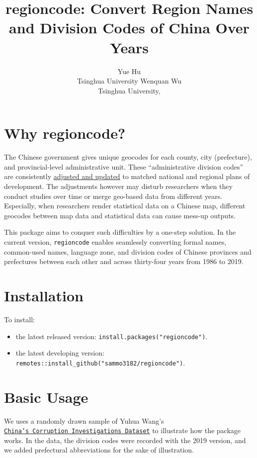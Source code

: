 \documentclass[
  article]{jss}
\author{Yue Hu\\Tsinghua University \And Wenquan Wu\\Tsinghua
University,}
\title{regioncode: Convert Region Names and Division Codes of China Over
Years}
\providecommand{\tightlist}{%
  \setlength{\itemsep}{0pt}\setlength{\parskip}{0pt}}\usepackage{longtable,booktabs,array}
\begin{document}
\maketitle
\hypertarget{why-regioncode}{%
\section{Why regioncode?}\label{why-regioncode}}

The Chinese government gives unique geocodes for each county, city
(prefecture), and provincial-level administrative unit. These
``administrative division codes'' are consistently
\href{http://www.mca.gov.cn/article/sj/xzqh/1980/}{adjusted and updated}
to matched national and regional plans of development. The adjustments
however may disturb researchers when they conduct studies over time or
merge geo-based data from different years. Especially, when researchers
render statistical data on a Chinese map, different geocodes between map
data and statistical data can cause mess-up outputs.

This package aims to conquer such difficulties by a one-step solution.
In the current version, \texttt{regioncode} enables seamlessly
converting formal names, common-used names, language zone, and division
codes of Chinese provinces and prefectures between each other and across
thirty-four years from 1986 to 2019.

\hypertarget{installation}{%
\section{Installation}\label{installation}}

To install:

\begin{itemize}
\tightlist
\item
  the latest released version: \texttt{install.packages("regioncode")}.
\item
  the latest developing version:
  \texttt{remotes::install\_github("sammo3182/regioncode")}.
\end{itemize}

\hypertarget{basic-usage}{%
\section{Basic Usage}\label{basic-usage}}

We uses a randomly drawn sample of Yuhua Wang's
\href{https://dataverse.harvard.edu/dataset.xhtml?persistentId=doi:10.7910/DVN/9QZRAD}{\texttt{China’s\ Corruption\ Investigations\ Dataset}}
to illustrate how the package works. In the data, the division codes
were recorded with the 2019 version, and we added prefectural
abbreviations for the sake of illustration.
\end{document}
